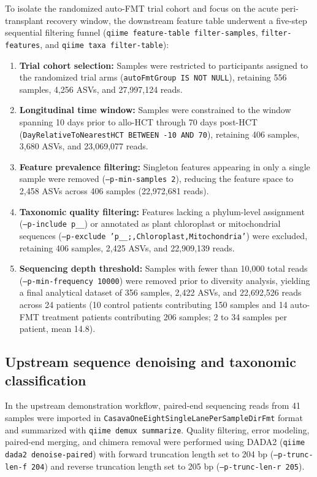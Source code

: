 To isolate the randomized auto-FMT trial cohort and focus on the acute peri-transplant recovery window, the downstream feature table underwent a five-step sequential filtering funnel (\texttt{qiime feature-table filter-samples}, \texttt{filter-features}, and \texttt{qiime taxa filter-table}):
\begin{enumerate}
  \item \textbf{Trial cohort selection:} Samples were restricted to participants assigned to the randomized trial arms (\texttt{autoFmtGroup IS NOT NULL}), retaining 556 samples, 4,256 ASVs, and 27,997,124 reads.
  \item \textbf{Longitudinal time window:} Samples were constrained to the window spanning 10 days prior to allo-HCT through 70 days post-HCT (\texttt{DayRelativeToNearestHCT BETWEEN -10 AND 70}), retaining 406 samples, 3,680 ASVs, and 23,069,077 reads.
  \item \textbf{Feature prevalence filtering:} Singleton features appearing in only a single sample were removed (\texttt{--p-min-samples 2}), reducing the feature space to 2,458 ASVs across 406 samples (22,972,681 reads).
  \item \textbf{Taxonomic quality filtering:} Features lacking a phylum-level assignment (\texttt{--p-include p\_\_}) or annotated as plant chloroplast or mitochondrial sequences (\texttt{--p-exclude 'p\_\_;,Chloroplast,Mitochondria'}) were excluded, retaining 406 samples, 2,425 ASVs, and 22,909,139 reads.
  \item \textbf{Sequencing depth threshold:} Samples with fewer than 10,000 total reads (\texttt{--p-min-frequency 10000}) were removed prior to diversity analysis, yielding a final analytical dataset of 356 samples, 2,422 ASVs, and 22,692,526 reads across 24 patients (10 control patients contributing 150 samples and 14 auto-FMT treatment patients contributing 206 samples; 2 to 34 samples per patient, mean 14.8).
\end{enumerate}

\subsection{Upstream sequence denoising and taxonomic classification}
In the upstream demonstration workflow, paired-end sequencing reads from 41 samples were imported in \texttt{CasavaOneEightSingleLanePerSampleDirFmt} format and summarized with \texttt{qiime demux summarize}. Quality filtering, error modeling, paired-end merging, and chimera removal were performed using DADA2 \citep{callahan2016dada2} (\texttt{qiime dada2 denoise-paired}) with forward truncation length set to 204 bp (\texttt{--p-trunc-len-f 204}) and reverse truncation length set to 205 bp (\texttt{--p-trunc-len-r 205}).

